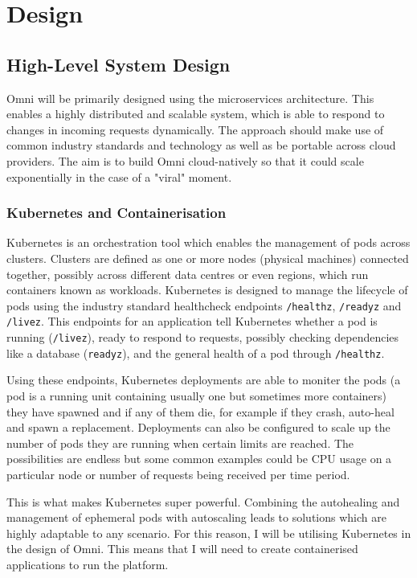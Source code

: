 \chapter{Design}
\label{cha:design}

\section{High-Level System Design}
\label{sec:design-system}
Omni will be primarily designed using the microservices architecture. This enables a highly distributed and scalable system, which is able to respond to changes in incoming requests dynamically. 
The approach should make use of common industry standards and technology as well as be portable across cloud providers. The aim is to build Omni cloud-natively so that it could scale exponentially in the case of a "viral" moment.

\subsection{Kubernetes and Containerisation}
\label{sec:design-system-kubernetes}
Kubernetes is an orchestration tool which enables the management of pods across clusters. Clusters are defined as one or more nodes (physical machines) connected together, possibly across different data centres or even regions, which run containers known as workloads.
Kubernetes is designed to manage the lifecycle of pods using the industry standard healthcheck endpoints \texttt{/healthz}, \texttt{/readyz} and \texttt{/livez}. This endpoints for an application tell Kubernetes whether a pod is running (\texttt{/livez}), ready to respond to requests, possibly checking dependencies like a database (\texttt{readyz}), and the general health of a pod through \texttt{/healthz}.

Using these endpoints, Kubernetes deployments are able to moniter the pods (a pod is a running unit containing usually one but sometimes more containers) they have spawned and if any of them die, for example if they crash, auto-heal and spawn a replacement.
Deployments can also be configured to scale up the number of pods they are running when certain limits are reached. The possibilities are endless but some common examples could be CPU usage on a particular node or number of requests being received per time period.

This is what makes Kubernetes super powerful. Combining the autohealing and management of ephemeral pods with autoscaling leads to solutions which are highly adaptable to any scenario.
For this reason, I will be utilising Kubernetes in the design of Omni. This means that I will need to create containerised applications to run the platform.

